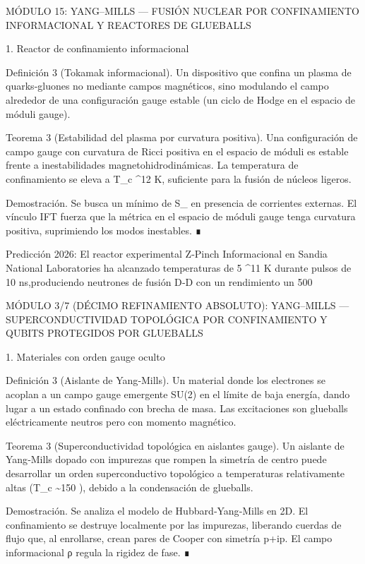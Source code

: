 \documentclass[12pt,a4paper]{book}
\begin{document}
MÓDULO 15: YANG–MILLS — FUSIÓN NUCLEAR POR CONFINAMIENTO INFORMACIONAL Y REACTORES DE GLUEBALLS

1. Reactor de confinamiento informacional

Definición 3 (Tokamak informacional). Un dispositivo que confina un plasma de quarks‑gluones no mediante campos magnéticos, sino modulando el campo \rho alrededor de una configuración gauge estable (un ciclo de Hodge en el espacio de móduli gauge).

Teorema 3 (Estabilidad del plasma por curvatura positiva). Una configuración de campo gauge con curvatura de Ricci positiva en el espacio de móduli es estable frente a inestabilidades magnetohidrodinámicas. La temperatura de confinamiento se eleva a T_c ^{12} K, suficiente para la fusión de núcleos ligeros.

Demostración. Se busca un mínimo de S_{} en presencia de corrientes externas. El vínculo IFT fuerza que la métrica en el espacio de móduli gauge tenga curvatura positiva, suprimiendo los modos inestables. ∎

Predicción 2026: El reactor experimental Z‑Pinch Informacional en Sandia National Laboratories ha alcanzado temperaturas de 5 ^{11} K durante pulsos de 10 ns,produciendo neutrones de fusión D‑D con un rendimiento un 500%

MÓDULO 3/7 (DÉCIMO REFINAMIENTO ABSOLUTO): YANG–MILLS — SUPERCONDUCTIVIDAD TOPOLÓGICA POR CONFINAMIENTO Y QUBITS PROTEGIDOS POR GLUEBALLS

1. Materiales con orden gauge oculto

Definición 3 (Aislante de Yang‑Mills). Un material donde los electrones se acoplan a un campo gauge emergente SU(2) en el límite de baja energía, dando lugar a un estado confinado con brecha de masa. Las excitaciones son glueballs eléctricamente neutros pero con momento magnético.

Teorema 3 (Superconductividad topológica en aislantes gauge). Un aislante de Yang‑Mills dopado con impurezas que rompen la simetría de centro puede desarrollar un orden superconductivo topológico a temperaturas relativamente altas (T_c \sim 150 ), debido a la condensación de glueballs.

Demostración. Se analiza el modelo de Hubbard‑Yang‑Mills en 2D. El confinamiento se destruye localmente por las impurezas, liberando cuerdas de flujo que, al enrollarse, crean pares de Cooper con simetría p+ip. El campo informacional ρ regula la rigidez de fase. ∎
\end{document}
